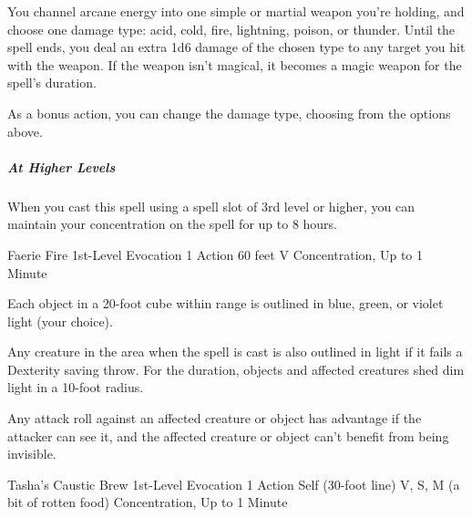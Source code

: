 \documentclass[letterpaper,openany,oneside,twocolumn]{book}
\begin{document}
You channel arcane energy into one simple or martial weapon you're holding, and choose one damage type: acid, cold, fire, lightning, poison, or thunder. Until the spell ends, you deal an extra 1d6 damage of the chosen type to any target you hit with the weapon. If the weapon isn't magical, it becomes a magic weapon for the spell's duration.

As a bonus action, you can change the damage type, choosing from the options above.

\subparagraph*{At Higher Levels} When you cast this spell using a spell slot of 3rd level or higher, you can maintain your concentration on the spell for up to 8 hours.

\DndSpellHeader
  {Faerie Fire}
  {1st-Level Evocation}
  {1 Action}
  {60 feet}
  {V}
  {Concentration, Up to 1 Minute}

Each object in a 20-foot cube within range is outlined in blue, green, or violet light (your choice).

Any creature in the area when the spell is cast is also outlined in light if it fails a Dexterity saving throw. For the duration, objects and affected creatures shed dim light in a 10-foot radius.

Any attack roll against an affected creature or object has advantage if the attacker can see it, and the affected creature or object can't benefit from being invisible.

%
%
%
%

\DndSpellHeader
  {Tasha's Caustic Brew}
  {1st-Level Evocation}
  {1 Action}
  {Self (30-foot line)}
  {V, S, M (a bit of rotten food)}
  {Concentration, Up to 1 Minute}
\end{document}
